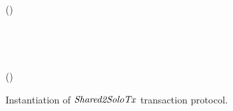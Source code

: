 \begin{figure}
\begin{center}
{\begin{varwidth}{\textwidth}
{            \< \<  \opAssign \funStar{\varBlindingFactorBob} \opSub \varBlindingFactorBob \\
            \< \scriptstyle {} \< \\
            \< \scriptstyle (\varSigAlice \opSeperate \varSigBob) \opFunResult {} \< \\
              \< \< \\
            \procVerfProof{\varProofBob}  \< \< \\
            \varSigFin \opFunResult \procFinSig{\varSigAlice}{\varSigBob} \< \< \\
            \varExcess \opAssign {} \opAddPoint {} \< \< \\
            \pcreturn \varTx \opAssign \varTx \opUnion (\varExcess \opSeperate \varSigFin)
            }
        \end{varwidth}
        }
    \end{center}
    \caption{Instantiation of $\mathit{Shared2SoloTx}$ transaction protocol. \label{fig:Mu2SoTx}}
\end{figure}

